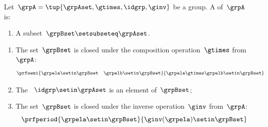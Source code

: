 \begin{definition}[Subgroup]\label{def:subgroup}
    Let~$\grpA = \tup{\grpAset, \gtimes, \idgrp, \ginv}$ be a group.
    A  of~$\grpA$ is:

    \constit

    \begin{enumerate}
        \item A subset~$\grpBset \setsubseteq \grpAset$.
    \end{enumerate}

    \condit

    \begin{enumerate}
        \item The set~$\grpBset$ is closed under the composition operation~$\gtimes$ from~$\grpA$:
              \begin{equation}
                  \prfsemi{
                      \grpela \setin \grpBset \quad \grpelb \setin \grpBset
                  }{
                      \grpela \gtimes \grpelb \setin \grpBset
                  }
              \end{equation}

        \item The ~$\idgrp \setin \grpAset$ is an element of~$\grpBset$;

        \item The set~$\grpBset$ is closed under the inverse operation~$\ginv$ from~$\grpA$:
              \begin{equation}
                  \prfperiod{
                      \grpela \setin \grpBset
                  }{
                      \ginv(\grpela) \setin \grpBset
                  }
              \end{equation}
    \end{enumerate}
\end{definition}





